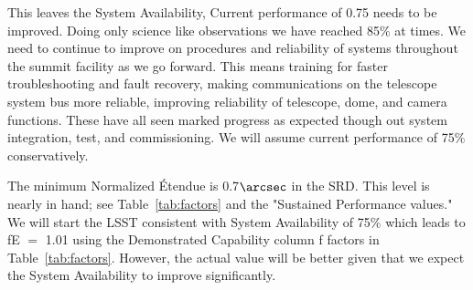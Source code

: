 This leaves the System Availability, Current performance of 0.75 needs to be improved. Doing only science like observations we have reached 85$\%$ at times. We need to continue to improve on procedures and reliability of systems throughout the summit facility as we go forward. This means training for faster troubleshooting and fault recovery, making communications on the telescope system bus more reliable, improving reliability of telescope, dome, and camera functions. These have all seen marked progress as expected though out system integration, test, and commissioning. We will assume current performance of 75$\%$ conservatively. 

The minimum Normalized \'{E}tendue is 0.7$\arcsec$ in the SRD. This level is nearly in hand; see Table~\ref{tab:factors} and the "Sustained Performance values." We will start the LSST consistent with System Availability of 75$\%$ which leads to fE $=$ 1.01 using the Demonstrated Capability column f factors in Table~\ref{tab:factors}. However, the actual value will be better given that we expect the System Availability to improve significantly. 

\newpage

